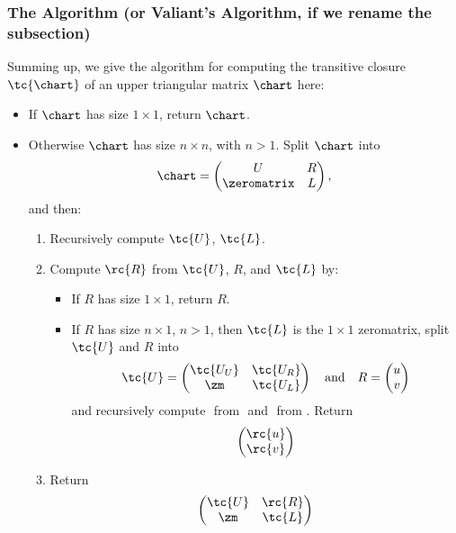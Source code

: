 \subsubsection{The Algorithm (or Valiant's Algorithm, if we rename the subsection)}
Summing up, we give the algorithm for computing the transitive closure $\tc{\chart}$ of an upper triangular matrix $\chart$ here:
\begin{itemize}
\item If $\chart$ has size $1 \times 1$, return $\chart$.
\item Otherwise $\chart$ has size $n \times n$, with $n > 1$. Split $\chart$ into
  \begin{equation*}
    \chart = 
    \begin{pmatrix}
      U           &  R \\
      \zeromatrix &  L
    \end{pmatrix},
  \end{equation*}
  and then: 
  \begin{enumerate}
  \item Recursively compute $\tc{U}$, $\tc{L}$.
  \item Compute $\rc{R}$ from $\tc{U}$, $R$, and $\tc{L}$ by:
    \begin{itemize}
    \item If $R$ has size $1 \times 1$, return $R$.
    \item If $R$ has size $n \times 1$, $n > 1$, then $\tc{L}$ is the $1\times 1$ zeromatrix, split $\tc{U}$ and $R$ into
      \begin{equation*}
        \tc{U} = 
        \begin{pmatrix}
          \tc{U_U} & \tc{U_R} \\
          \zm      & \tc{U_L} 
        \end{pmatrix} \quad \text{and}\quad
        R = 
        \begin{pmatrix}
          u \\
          v
        \end{pmatrix}
      \end{equation*}
        and recursively compute $ $ from $ $ and $ $ from $ $. Return
        \begin{equation*}
          \begin{pmatrix}
            \rc{u}\\
            \rc{v}
          \end{pmatrix}
        \end{equation*}
    \end{itemize}
    \item Return 
      \begin{equation*}
        \begin{pmatrix}
          \tc{U} & \rc{R} \\
          \zm    & \tc{L}
        \end{pmatrix}
      \end{equation*}
  \end{enumerate}
\end{itemize}

